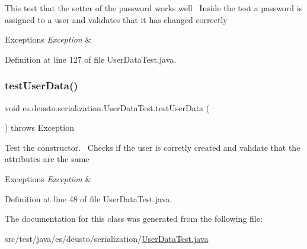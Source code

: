 This test that the setter of the password works well~\newline
Inside the test a password is assigned to a user and validates that it has changed correctly~\newline

\begin{DoxyExceptions}{Exceptions}
{\em Exception} & \\
\hline
\end{DoxyExceptions}


Definition at line 127 of file User\+Data\+Test.\+java.

\mbox{\label{classes_1_1deusto_1_1serialization_1_1_user_data_test_ac1b9100261a66d06a4c8bf4f80e859ba}} 
\subsubsection{\texorpdfstring{test\+User\+Data()}{testUserData()}}
{\footnotesize\ttfamily void es.\+deusto.\+serialization.\+User\+Data\+Test.\+test\+User\+Data (\begin{DoxyParamCaption}{ }\end{DoxyParamCaption}) throws Exception}

Test the constructor.~\newline
Checks if the user is corretly created and validate that the attributes are the same 
\begin{DoxyExceptions}{Exceptions}
{\em Exception} & \\
\hline
\end{DoxyExceptions}


Definition at line 48 of file User\+Data\+Test.\+java.



The documentation for this class was generated from the following file\+:\begin{DoxyCompactItemize}
\item 
src/test/java/es/deusto/serialization/\hyperlink{_user_data_test_8java}{User\+Data\+Test.\+java}\end{DoxyCompactItemize}
